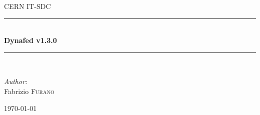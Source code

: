 \documentclass[12pt]{article} %
\begin{document}

\begin{titlepage}

\newcommand{\HRule}{\rule{\linewidth}{0.5mm}} %

\center %

\textsc{\LARGE CERN IT-SDC}\\[1.5cm] %

\HRule \\[0.4cm]
{ \huge \bfseries Dynafed v1.3.0}\\[0.4cm] %
\HRule \\[1.5cm]

\begin{minipage}{0.4\textwidth}
\begin{flushleft} \large
\emph{Author:}\\
Fabrizio \textsc{Furano} \\ %
\end{flushleft}
\end{minipage}

{\large \today}\\[3cm] %




\vfill %

\end{titlepage}
\end{document}
